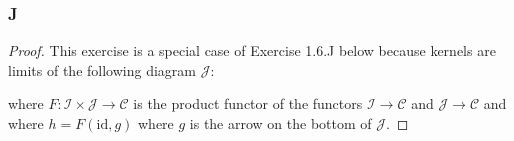 \documentclass{article}
\newcommand{\id}{\mathrm{id}}
\newcommand{\fC}{\mathscr{C}}
\newcommand{\fI}{\mathscr{I}}
\newcommand{\fJ}{\mathscr{J}}
\begin{document}
\subsubsection{J}\label{1.6.J}
\begin{proof}
    This exercise is a special case of Exercise 1.6.J below because kernels are limits of the following diagram $\fJ$:
    \begin{center}
    \end{center}
where $F:\fI\times \fJ\to \fC$ is the product functor of the functors $\fI \to \fC$ and $\fJ\to \fC$ and where $h=F(\id, g)$ where $g$ is the arrow on the bottom of $\fJ$.
\end{proof}
\end{document}
